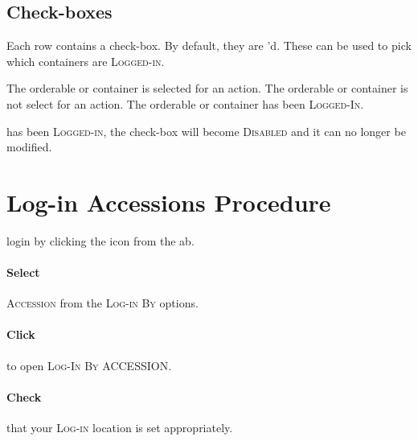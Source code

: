 \subsection{Check-boxes}

Each row contains a check-box. By default, they are \faCheckSquareO'd. These can be used to pick which containers are \textsc{Logged-in}.

\begin{description}
   The orderable or container is selected for an action.
   The orderable or container is not select for an action.
   The orderable or container has been \textsc{Logged-In}.
\end{description}

 has been \textsc{Logged-in}, the check-box will become \textsc{Disabled} and it can no longer be modified. 

\section{Log-in Accessions Procedure\label{sec:login_procedure}}

 \gls{login} by clicking the  icon from the \gls{ab}.

\paragraph{Select} \textsc{Accession} from the  \textsc{Log-in By} options.

\paragraph{Click}  to open \textsc{Log-In By ACCESSION}.\\


\paragraph{Check}  that your \textsc{Log-in} location is set appropriately.\\

